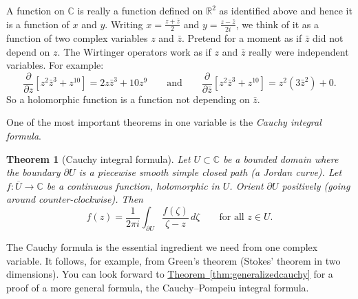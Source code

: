 \documentclass[12pt,openany]{book}
\newcommand{\C}{{\mathbb{C}}}
\newcommand{\R}{{\mathbb{R}}}
\newcommand{\myindex}[1]{#1\index{#1}}
\theoremstyle{plain}
\newtheorem{thm}{Theorem}[section]
\theoremstyle{remark}
\theoremstyle{definition}
\theoremstyle{exercise}
\theoremstyle{example}
\newcommand{\thmref}[1]{\hyperref[#1]{Theorem~\ref*{#1}}}
\begin{document}
A function on $\C$ is really a function defined on
$\R^2$ as identified above and hence it is a function of $x$ and $y$.
Writing
$x = \frac{z+\bar{z}}{2}$ and
$y = \frac{z-\bar{z}}{2i}$, we think of it as a function of two
complex variables $z$ and $\bar{z}$.  Pretend for a moment as if $\bar{z}$ did not
depend on $z$.
The Wirtinger operators
work as if $z$ and $\bar{z}$ really were independent variables.  For example:
\begin{equation*}
\frac{\partial}{\partial z}
\left[ z^2 \bar{z}^3 + z^{10} \right]
=
2z \bar{z}^3 + 10 z^{9}
\qquad
\text{and}
\qquad
\frac{\partial}{\partial \bar{z}}
\left[ z^2 \bar{z}^3 + z^{10} \right]
=
z^2 ( 3 \bar{z}^2 ) + 0 .
\end{equation*}
So a holomorphic function is a function not depending on $\bar{z}$.

One of the most important theorems in one variable is
the \emph{\myindex{Cauchy integral formula}}.

\begin{thm}[Cauchy integral formula]
Let $U \subset \C$ be a bounded domain where the boundary $\partial U$
is a piecewise smooth
simple closed path (a Jordan curve).  Let $f \colon \overline{U} \to \C$ be a continuous function,
holomorphic in $U$.
Orient $\partial U$ positively (going around counter-clockwise).
Then
\begin{equation*}
f(z) =
\frac{1}{2\pi i}
\int_{\partial U}
\frac{f(\zeta)}{\zeta-z}
\,
d \zeta 
\qquad \text{for all $z \in U$.}
\end{equation*}
\end{thm}


The Cauchy formula is the essential ingredient we need from 
one complex variable.  It follows, for example,
from Green's theorem (Stokes' theorem in two
dimensions).  You can look forward to
\thmref{thm:generalizedcauchy} for a proof of a more general formula,
the Cauchy--Pompeiu integral formula.
\end{document}
